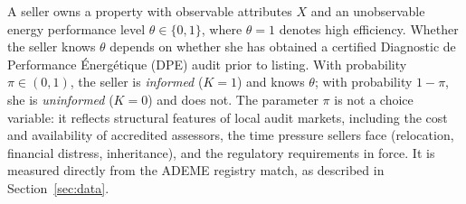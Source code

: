 A seller owns a property with observable attributes $X$ and an unobservable energy performance level $\theta \in \{0,1\}$, where $\theta=1$ denotes high efficiency. Whether the seller knows $\theta$ depends on whether she has obtained a certified Diagnostic de Performance \'{E}nerg\'{e}tique (DPE) audit prior to listing. With probability $\pi\in(0,1)$, the seller is \emph{informed} ($K=1$) and knows $\theta$; with probability $1-\pi$, she is \emph{uninformed} ($K=0$) and does not. The parameter $\pi$ is not a choice variable: it reflects structural features of local audit markets, including the cost and availability of accredited assessors, the time pressure sellers face (relocation, financial distress, inheritance), and the regulatory requirements in force. It is measured directly from the ADEME registry match, as described in Section~\ref{sec:data}.
